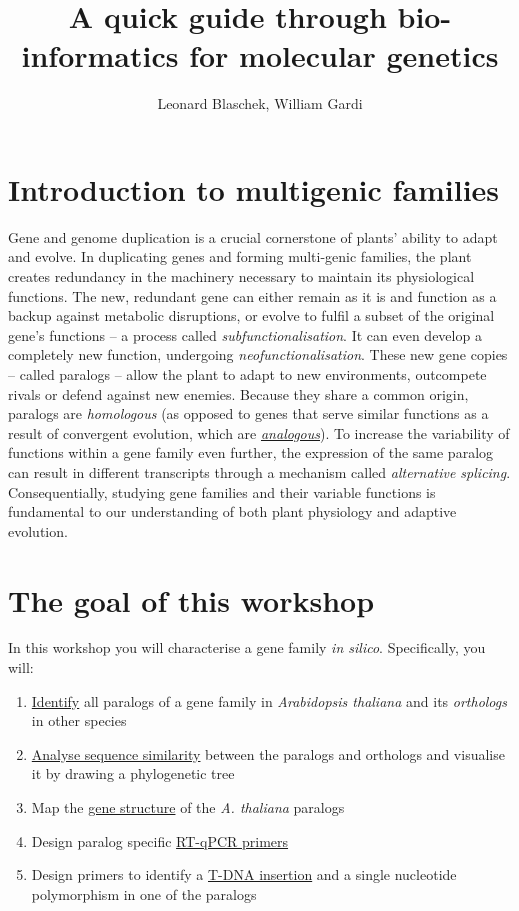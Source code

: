 \documentclass[11pt]{article}
\title{A quick guide through bio-informatics for molecular genetics}
\author{Leonard Blaschek, William Gardi}
\begin{document}
 	\maketitle
 	
 	\section*{Introduction to multigenic families}
 	
 	Gene and genome duplication is a crucial cornerstone of plants' ability to adapt and evolve.
 	In duplicating genes and forming multi-genic families, the plant creates redundancy in the machinery necessary to maintain its physiological functions. 
 	The new, redundant gene can either remain as it is and function as a backup against metabolic disruptions, or evolve to fulfil a subset of the original gene's functions --  a process called \textit{subfunctionalisation}.
 	It can even develop a completely new function, undergoing \textit{neofunctionalisation}.
 	These new gene copies -- called paralogs -- allow the plant to adapt to new environments, outcompete rivals or defend against new enemies.
 	Because they share a common origin, paralogs are \textit{homologous} (as opposed to genes that serve similar functions as a result of convergent evolution, which are \href{https://evolution.berkeley.edu/evolibrary/article/evo_09}{\textit{analogous}}).
 	To increase the variability of functions within a gene family even further, the expression of the same paralog can result in different transcripts through a mechanism called \textit{alternative splicing}.
 	Consequentially, studying gene families and their variable functions is fundamental to our understanding of both plant physiology and adaptive evolution.

 	\section*{The goal of this workshop}
 	
 	In this workshop you will characterise a gene family \textit{in silico}. Specifically, you will:
 	\begin{enumerate}
 		\item \hyperref[sec:find]{Identify} all paralogs of a gene family in \textit{Arabidopsis thaliana} and its \textit{orthologs} in other species
 		\item \hyperref[sec:phylo]{Analyse sequence similarity} between the paralogs and orthologs and visualise it by drawing a phylogenetic tree
 		\item Map the \hyperref[sec:str]{gene structure} of the \textit{A. thaliana} paralogs
 		\item Design paralog specific \hyperref[sec:qpcr]{RT-qPCR primers}
 		\item Design primers to identify a \hyperref[sec:mut]{T-DNA insertion} and a single nucleotide polymorphism in one of the paralogs
 	\end{enumerate}
 	
\end{document}

